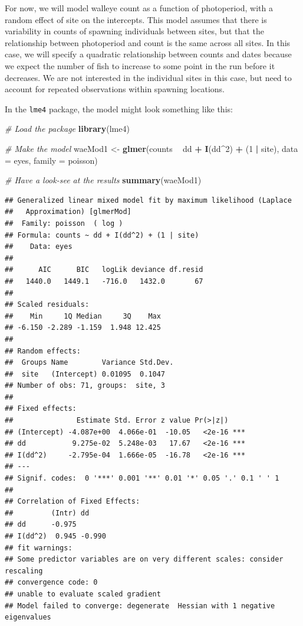 \documentclass[
]{book}
\newenvironment{Shaded}{\begin{snugshade}}{\end{snugshade}}
\newcommand{\CommentTok}[1]{\textcolor[rgb]{0.56,0.35,0.01}{\textit{#1}}}
\newcommand{\DataTypeTok}[1]{\textcolor[rgb]{0.13,0.29,0.53}{#1}}
\newcommand{\DecValTok}[1]{\textcolor[rgb]{0.00,0.00,0.81}{#1}}
\newcommand{\KeywordTok}[1]{\textcolor[rgb]{0.13,0.29,0.53}{\textbf{#1}}}
\newcommand{\NormalTok}[1]{#1}
\newcommand{\OperatorTok}[1]{\textcolor[rgb]{0.81,0.36,0.00}{\textbf{#1}}}
\newcommand{\StringTok}[1]{\textcolor[rgb]{0.31,0.60,0.02}{#1}}
\begin{document}
For now, we will model walleye count as a function of photoperiod, with a random effect of site on the intercepts. This model assumes that there is variability in counts of spawning individuals between sites, but that the relationship between photoperiod and count is the same across all sites. In this case, we will specify a quadratic relationship between counts and dates because we expect the number of fish to increase to some point in the run before it decreases. We are not interested in the individual sites in this case, but need to account for repeated observations within spawning locations.

In the \texttt{lme4} package, the model might look something like this:

\begin{Shaded}
\begin{Highlighting}[]
\CommentTok{# Load the package}
\KeywordTok{library}\NormalTok{(lme4)}

\CommentTok{# Make the model}
\NormalTok{waeMod1 <-}\StringTok{ }\KeywordTok{glmer}\NormalTok{(counts }\OperatorTok{~}\StringTok{ }\NormalTok{dd }\OperatorTok{+}\StringTok{ }\KeywordTok{I}\NormalTok{(dd}\OperatorTok{^}\DecValTok{2}\NormalTok{) }\OperatorTok{+}\StringTok{ }\NormalTok{(}\DecValTok{1} \OperatorTok{|}\StringTok{ }\NormalTok{site), }\DataTypeTok{data =}\NormalTok{ eyes, }\DataTypeTok{family =}\NormalTok{ poisson)}

\CommentTok{# Have a look-see at the results}
\KeywordTok{summary}\NormalTok{(waeMod1)}
\end{Highlighting}
\end{Shaded}

\begin{verbatim}
## Generalized linear mixed model fit by maximum likelihood (Laplace
##   Approximation) [glmerMod]
##  Family: poisson  ( log )
## Formula: counts ~ dd + I(dd^2) + (1 | site)
##    Data: eyes
## 
##      AIC      BIC   logLik deviance df.resid 
##   1440.0   1449.1   -716.0   1432.0       67 
## 
## Scaled residuals: 
##    Min     1Q Median     3Q    Max 
## -6.150 -2.289 -1.159  1.948 12.425 
## 
## Random effects:
##  Groups Name        Variance Std.Dev.
##  site   (Intercept) 0.01095  0.1047  
## Number of obs: 71, groups:  site, 3
## 
## Fixed effects:
##               Estimate Std. Error z value Pr(>|z|)    
## (Intercept) -4.087e+00  4.066e-01  -10.05   <2e-16 ***
## dd           9.275e-02  5.248e-03   17.67   <2e-16 ***
## I(dd^2)     -2.795e-04  1.666e-05  -16.78   <2e-16 ***
## ---
## Signif. codes:  0 '***' 0.001 '**' 0.01 '*' 0.05 '.' 0.1 ' ' 1
## 
## Correlation of Fixed Effects:
##         (Intr) dd    
## dd      -0.975       
## I(dd^2)  0.945 -0.990
## fit warnings:
## Some predictor variables are on very different scales: consider rescaling
## convergence code: 0
## unable to evaluate scaled gradient
## Model failed to converge: degenerate  Hessian with 1 negative eigenvalues
\end{verbatim}
\end{document}

